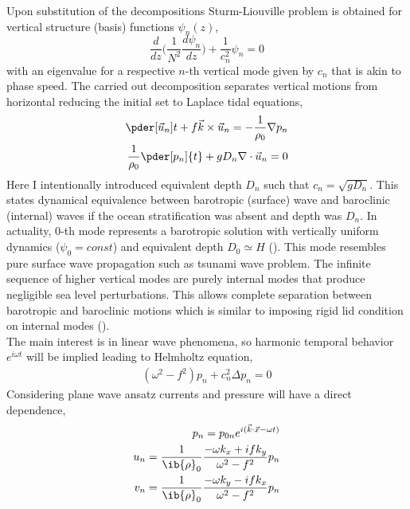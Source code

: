 Upon substitution of the decompositions Sturm-Liouville problem is obtained for vertical structure (basis) functions $\psi_n(z)$,
\begin{equation}
\frac{d}{dz}\big( \frac{1}{N^2} \frac{d \psi_n}{dz} \big) + \frac{1}{c^2_n}\psi_n = 0
\end{equation}
with an eigenvalue for a respective $n$-th vertical mode given by $c_n$ that is akin to phase speed. The carried out decomposition separates vertical motions from horizontal reducing the initial set to Laplace tidal equations,
\begin{align}
\label{In:sweq}
\begin{split}
\pder[\vec{u}_n]{t} + f \vec{k} \times \vec{u}_n = -\frac{1}{\rho_0} \nabla p_n\\
\frac{1}{\rho_0} \pder[p_n]{t} + g D_n \nabla  \cdot \vec{u}_n = 0
\end{split}
\end{align}
Here I intentionally introduced equivalent depth $D_n$ such that $c_n = \sqrt{g D_n}$. This states dynamical equivalence between barotropic (surface) wave and baroclinic (internal) waves if the ocean stratification was absent and depth was $D_n$. In actuality, $0$-th mode represents a barotropic solution with vertically uniform dynamics ($\psi_0 = const$) and equivalent depth $D_0 \simeq H$ (\cite{hendershott1981long}). This mode resembles pure surface wave propagation such as tsunami wave problem. The infinite sequence of higher vertical modes are purely internal modes that produce negligible sea level perturbations. This allows complete separation between barotropic and baroclinic motions which is similar to imposing rigid lid condition on internal modes (\cite{kundu2008fluid}).\\
The main interest is in linear wave phenomena, so harmonic temporal behavior $e^{i \omega t}$ will be implied leading to Helmholtz equation,
\begin{align}
\label{In:helmeq}
(\omega^2 - f^2) p_n + c_n^2 \Delta p_n = 0
\end{align}
Considering plane wave ansatz currents and pressure will have a direct dependence,
\begin{align}
\label{In:svw}
\begin{split}
p_n = p_{0n} e^{i (\vec{k} \cdot \vec{x} -  \omega t)}\\
u_n = \frac{1}{\ib{\rho}_0} \frac{-\omega k_x + i f k_y}{\omega^2 - f^2} p_n\\
v_n = \frac{1}{\ib{\rho}_0} \frac{-\omega k_y - i f k_x}{\omega^2 - f^2} p_n
\end{split}
\end{align}
